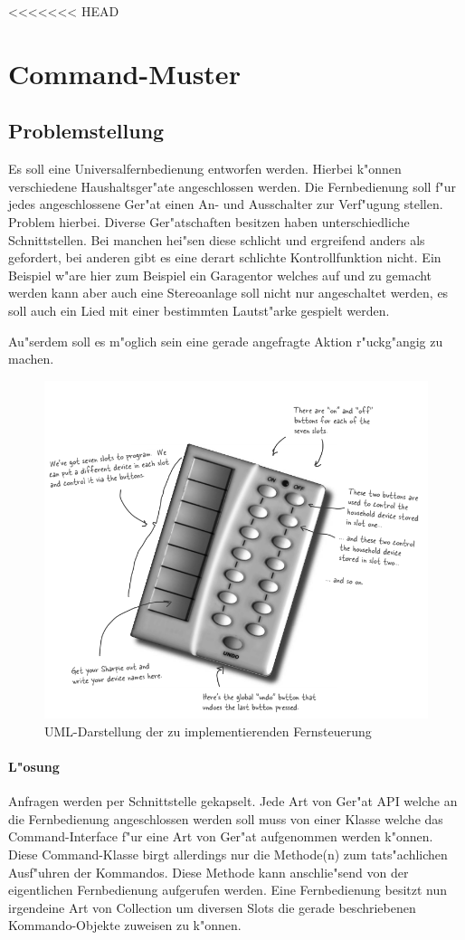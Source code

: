 <<<<<<< HEAD
\section{Command-Muster}

\subsection{Problemstellung}
Es soll eine Universalfernbedienung entworfen werden. Hierbei k"onnen verschiedene Haushaltsger"ate angeschlossen werden. Die Fernbedienung soll f"ur jedes angeschlossene Ger"at einen An- und Ausschalter zur Verf"ugung stellen. Problem hierbei. Diverse Ger"atschaften besitzen haben unterschiedliche Schnittstellen. Bei manchen hei"sen diese schlicht und ergreifend anders als gefordert, bei anderen gibt es eine derart schlichte Kontrollfunktion nicht. Ein Beispiel w"are hier zum Beispiel ein Garagentor welches auf und zu gemacht werden kann aber auch eine Stereoanlage soll nicht nur angeschaltet werden, es soll auch ein Lied mit einer bestimmten Lautst"arke gespielt werden. 

Au"serdem soll es m"oglich sein eine gerade angefragte Aktion r"uckg"angig zu machen. 

\begin{figure}[b!]
	\centering
	\includegraphics[width=.6\linewidth]{command/img/commandPatternRemote}
	\caption{UML-Darstellung der zu implementierenden Fernsteuerung}
	\label{fig:commandRemote}
\end{figure}

\paragraph{L"osung}
Anfragen werden per Schnittstelle gekapselt. Jede Art von Ger"at API welche an die Fernbedienung angeschlossen werden soll muss von einer Klasse welche das Command-Interface f"ur eine Art von Ger"at aufgenommen werden k"onnen. Diese Command-Klasse birgt allerdings nur die Methode(n) zum tats"achlichen Ausf"uhren der Kommandos. Diese Methode kann anschlie"send von der eigentlichen Fernbedienung aufgerufen werden. Eine Fernbedienung besitzt nun irgendeine Art von Collection um diversen Slots die gerade beschriebenen Kommando-Objekte zuweisen zu k"onnen. 

